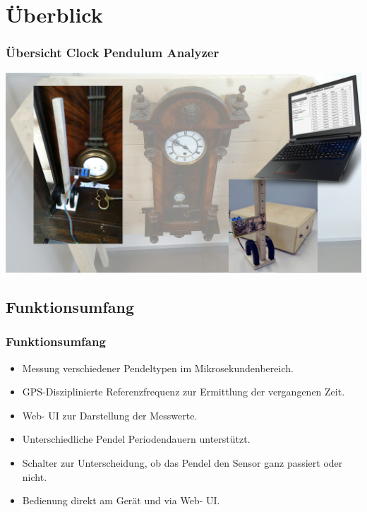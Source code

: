 \section{Überblick}
\begin{frame}
	\frametitle{Übersicht Clock Pendulum Analyzer}
	\includegraphics[width=\textwidth]{overview_system_title}
\end{frame}

\subsection{Funktionsumfang}
\begin{frame}
	\frametitle{Funktionsumfang}
	\begin{itemize}
		\item Messung verschiedener Pendeltypen im Mikrosekundenbereich.
		\item GPS-Disziplinierte Referenzfrequenz zur Ermittlung der vergangenen Zeit.
		\item Web- UI zur Darstellung der Messwerte.
		\item Unterschiedliche Pendel Periodendauern unterstützt.
		\item Schalter zur Unterscheidung, ob das Pendel den Sensor ganz passiert oder nicht.
		\item Bedienung direkt am Gerät und via Web- UI.
	\end{itemize}
\end{frame}